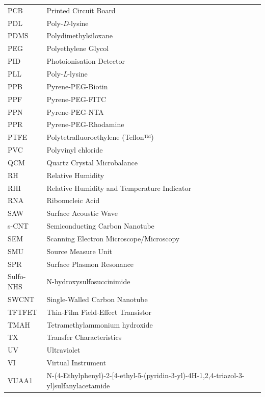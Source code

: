 \documentclass[
  a4paper,
]{scrbook}
\begin{document}
\newpage
\fancyhf{} %
\thispagestyle{fancy} %
\renewcommand{\headrulewidth}{0pt}
\fancyfoot[R]{\thepage} %
\begin{table}[H]
  \begin{tabular}{@{}p{} p{}@{}}  %
    PCB  & Printed Circuit Board   \\[5pt]
    PDL & Poly-\textit{D}-lysine  \\[5pt]
    PDMS  & Polydimethylsiloxane   \\  [5pt]
    PEG  & Polyethylene Glycol  \\[5pt] 
    PID  & Photoionisation Detector  \\[5pt] 
    PLL  & Poly-\textit{L}-lysine  \\[5pt]
    PPB  & Pyrene-PEG-Biotin  \\[5pt]
    PPF  & Pyrene-PEG-FITC  \\[5pt]
    PPN  & Pyrene-PEG-NTA  \\[5pt]
    PPR  & Pyrene-PEG-Rhodamine  \\[5pt]
    PTFE  & Polytetrafluoroethylene (Teflon™)  \\[5pt]
    PVC  & Polyvinyl chloride  \\[5pt]
    QCM  & Quartz Crystal Microbalance  \\[5pt]
    RH  & Relative Humidity  \\[5pt]
    RHI  & Relative Humidity and Temperature Indicator  \\[5pt] 
    RNA  & Ribonucleic Acid   \\[5pt]
    SAW  & Surface Acoustic Wave   \\[5pt]
    s-CNT  & Semiconducting Carbon Nanotube   \\[5pt]
    SEM  & Scanning Electron Microscope/Microscopy   \\[5pt]
    SMU  & Source Measure Unit   \\[5pt]
    SPR  & Surface Plasmon Resonance   \\[5pt]
    Sulfo-NHS  & N-hydroxysulfosuccinimide   \\[5pt]
    SWCNT  & Single-Walled Carbon Nanotube   \\[5pt]
    TFTFET  & Thin-Film Field-Effect Transistor  \\[5pt]
    TMAH  & Tetramethylammonium hydroxide  \\[5pt]
    TX  & Transfer Characteristics  \\[5pt]
    UV  & Ultraviolet  \\[5pt]
    VI  & Virtual Instrument  \\[5pt]
    VUAA1  & N-(4-Ethylphenyl)-2-{[4-ethyl-5-(pyridin-3-yl)-4H-1,2,4-triazol-3-yl]sulfanyl}acetamide  \\[5pt] 
  \end{tabular}
\end{table}
\end{document}
